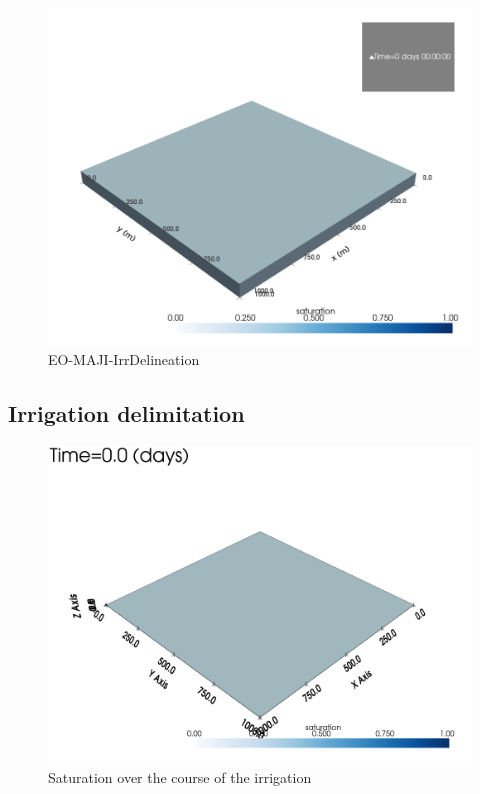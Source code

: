 \documentclass{article}
\begin{document}
\begin{figure}[!htbp]
\centering
\includegraphics[width=0.75\linewidth]{files/EOMAJI_mesh-509781dd4b086cb32383299dabc9f88d.png}
\caption*{EO-MAJI-IrrDelineation}
\end{figure}

\subsection{Irrigation delimitation}

\begin{figure}[!htbp]
\centering
\includegraphics[width=0.75\linewidth]{files/vtksaturation-6351a4b146f09c4ae6b6fcd05adccf86.gif}
\caption*{Saturation over the course of the irrigation}
\end{figure}
\end{document}
